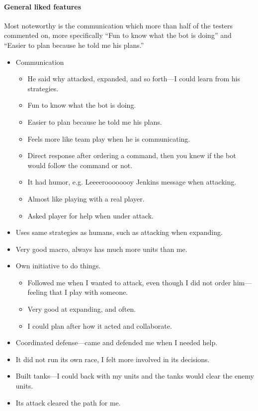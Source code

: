 \paragraph{General liked features}
Most noteworthy is the communication which more than half of the testers commented on, more
specifically ``Fun to know what the bot is doing'' and ``Easier to plan because he told me his
plans.''
\begin{itemize}
	\item Communication
	\begin{itemize}
		\item He said why attacked, expanded, and so forth—I could learn from his strategies.
		\item Fun to know what the bot is doing.
		\item Easier to plan because he told me his plans.
		\item Feels more like team play when he is communicating.
		\item Direct response after ordering a command, then you knew if the bot would follow the command or not.
		\item It had humor, e.g. Leeeeroooooooy Jenkins message when attacking.
		\item Almost like playing with a real player.
		\item Asked player for help when under attack.
	\end{itemize}
	\item Uses same strategies as humans, such as attacking when expanding.
	\item Very good macro, always has much more units than me.
	\item Own initiative to do things.
	\begin{itemize}
		\item Followed me when I wanted to attack, even though I did not order him—feeling that I play with someone.
		\item Very good at expanding, and often.
		\item I could plan after how it acted and collaborate.
	\end{itemize}
	\item Coordinated defense—came and defended me when I needed help.
	\item It did not run its own race, I felt more involved in its decisions.
	\item Built tanks—I could back with my units and the tanks would clear the enemy units.
	\item Its attack cleared the path for me.
\end{itemize}

